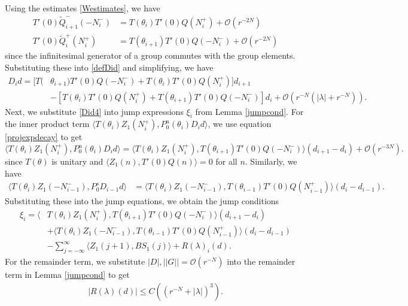 \documentclass[12pt]{elsarticle}
\begin{document}
Using the estimates \eqref{Westimates}, we have
\begin{align*}
T'(0) \tilde{Q}_{i+1}^-(-N_i^-) &= T(\theta_i) T'(0) Q(N_i^+) + \mathcal{O}(r^{-2N}) \\
T'(0) \tilde{Q}_i^+(N_i^+) &= T(\theta_{i+1}) T'(0) Q(-N_i^-) + \mathcal{O}(r^{-2N})
\end{align*}
since the infinitesimal generator of a group commutes with the group elements. Substituting these into \eqref{defDid} and simplifying, we have
\begin{equation}\label{Did4}
\begin{aligned}
D_i d = [ T(&\theta_{i+1}) T'(0)Q(-N_i^-) + T(\theta_i) T'(0)Q(N_i^+) ] d_{i+1} \\
&- [ T(\theta_i) T'(0)Q(N_i^+) + T(\theta_{i+1}) T'(0)Q(-N_i^-) ] d_i 
+\mathcal{O}(r^{-N}( |\lambda| + r^{-N})).
\end{aligned}
\end{equation}
Next, we substitute \eqref{Did4} into jump expressions $\xi_i$ from Lemma \ref{jumpcond}. For the inner product term $\langle T(\theta_i) Z_1(N_i^+), P_0^u(\theta_i) D_i d \rangle$, we use equation \eqref{projexpdecay} to get
\begin{equation*}
\langle T(\theta_i) Z_1(N_i^+), P_0^u(\theta_i) D_i d \rangle 
= \langle T(\theta_i) Z_1(N_i^+), T(\theta_{i+1}) T'(0)Q(-N_i^-) \rangle (d_{i+1} - d_i)
+ \mathcal{O}(r^{-3N}).
\end{equation*}
since $T(\theta)$ is unitary and $\langle Z_1(n), T'(0)Q(n) \rangle = 0$ for all $n$. Similarly, we have
\begin{align*}
\langle T(\theta_i) Z_1(-N_{i-1}^-), P_0^s D_{i-1} d \rangle 
&= \langle T(\theta_i) Z_1(-N_{i-1}^-), T(\theta_{i-1}) T'(0)Q(N_{i-1}^+) \rangle (d_i - d_{i-1}).
\end{align*}
Substituting these into the jump equations, we obtain the jump conditions
\begin{align*}
\xi_i = \langle &T(\theta_i) Z_1(N_i^+), T(\theta_{i+1}) T'(0)Q(-N_i^-) \rangle (d_{i+1} - d_i) \\
&+ \langle T(\theta_i) Z_1(-N_{i-1}^-), T(\theta_{i-1}) T'(0)Q(N_{i-1}^+) \rangle (d_i - d_{i-1}) \\
&- \sum_{j = -\infty}^{\infty} \langle Z_1(j+1), B S_1(j)\rangle + R(\lambda)_i(d).
\end{align*}
For the remainder term, we substitute $|D|, ||G|| = \mathcal{O}(r^{-N})$ into the remainder term in Lemma \ref{jumpcond} to get
\begin{align*}
|R(\lambda)(d)| \leq C\left( (r^{-N} + |\lambda|)^3 \right).
\end{align*} 
\end{document}
